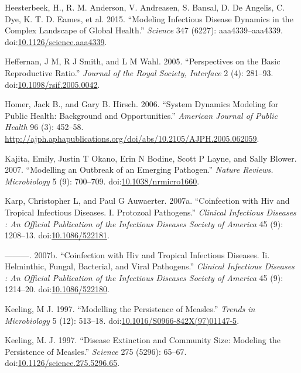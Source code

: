 \documentclass[]{book}
\theoremstyle{definition}
\theoremstyle{definition}
\theoremstyle{definition}
\theoremstyle{remark}
\begin{document}
\hypertarget{ref-heesterbeek15}{}
Heesterbeek, H., R. M. Anderson, V. Andreasen, S. Bansal, D. De Angelis,
C. Dye, K. T. D. Eames, et al. 2015. ``Modeling Infectious Disease
Dynamics in the Complex Landscape of Global Health.'' \emph{Science} 347
(6227): aaa4339--aaa4339.
doi:\href{https://doi.org/10.1126/science.aaa4339}{10.1126/science.aaa4339}.

\hypertarget{ref-heffernan05}{}
Heffernan, J M, R J Smith, and L M Wahl. 2005. ``Perspectives on the
Basic Reproductive Ratio.'' \emph{Journal of the Royal Society,
Interface} 2 (4): 281--93.
doi:\href{https://doi.org/10.1098/rsif.2005.0042}{10.1098/rsif.2005.0042}.

\hypertarget{ref-homer06}{}
Homer, Jack B., and Gary B. Hirsch. 2006. ``System Dynamics Modeling for
Public Health: Background and Opportunities.'' \emph{American Journal of
Public Health} 96 (3): 452--58.
\url{http://ajph.aphapublications.org/doi/abs/10.2105/AJPH.2005.062059}.

\hypertarget{ref-kajita07}{}
Kajita, Emily, Justin T Okano, Erin N Bodine, Scott P Layne, and Sally
Blower. 2007. ``Modelling an Outbreak of an Emerging Pathogen.''
\emph{Nature Reviews. Microbiology} 5 (9): 700--709.
doi:\href{https://doi.org/10.1038/nrmicro1660}{10.1038/nrmicro1660}.

\hypertarget{ref-karp07a}{}
Karp, Christopher L, and Paul G Auwaerter. 2007a. ``Coinfection with Hiv
and Tropical Infectious Diseases. I. Protozoal Pathogens.''
\emph{Clinical Infectious Diseases : An Official Publication of the
Infectious Diseases Society of America} 45 (9): 1208--13.
doi:\href{https://doi.org/10.1086/522181}{10.1086/522181}.

\hypertarget{ref-karp07}{}
---------. 2007b. ``Coinfection with Hiv and Tropical Infectious
Diseases. Ii. Helminthic, Fungal, Bacterial, and Viral Pathogens.''
\emph{Clinical Infectious Diseases : An Official Publication of the
Infectious Diseases Society of America} 45 (9): 1214--20.
doi:\href{https://doi.org/10.1086/522180}{10.1086/522180}.

\hypertarget{ref-keeling97}{}
Keeling, M J. 1997. ``Modelling the Persistence of Measles.''
\emph{Trends in Microbiology} 5 (12): 513--18.
doi:\href{https://doi.org/10.1016/S0966-842X(97)01147-5}{10.1016/S0966-842X(97)01147-5}.

\hypertarget{ref-keeling97a}{}
Keeling, M. J. 1997. ``Disease Extinction and Community Size: Modeling
the Persistence of Measles.'' \emph{Science} 275 (5296): 65--67.
doi:\href{https://doi.org/10.1126/science.275.5296.65}{10.1126/science.275.5296.65}.
\end{document}
